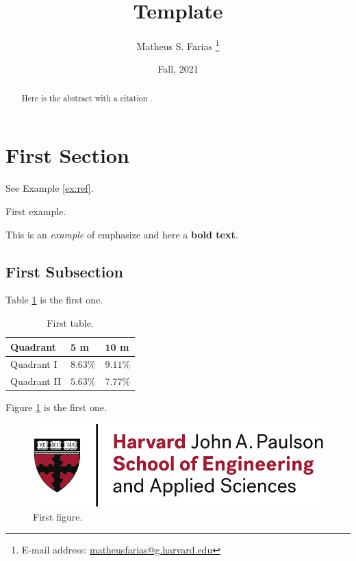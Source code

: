 \documentclass[abstract=true]{scrartcl}
\begin{document}
\title{Template}
\date{Fall, 2021}

\author{Matheus S. Farias%
  \thanks{E-mail address: \href{mailto:matheusfarias@g.harvard.edu}{matheusfarias@g.harvard.edu}}}

\maketitle

\begin{abstract}
    Here is the abstract with a citation \cite{shannon48}.
\end{abstract}

\tableofcontents

\section{First Section}
See Example \ref{ex:ref}.
\begin{example}
    First example.
    \label{ex:ref}
\end{example}

This is an \emph{example} of emphasize and here a \textbf{bold text}.

\subsection{First Subsection}

Table \ref{tab:ref} is the first one.
\begin{table}[h]
    \centering
    \caption{\label{tab:ref}First table.}
    \vspace{5pt}
    \begin{tabular}{@{}lll@{}}
    \toprule
    \textbf{Quadrant}    & $\mathbf{5}$ \textbf{m}    & $\mathbf{10}$ \textbf{m}    \\
    \midrule
    Quadrant I  & $8.63\%$ & $9.11\%$ \\
    Quadrant II & $5.63\%$ & $7.77\%$   \\ 
    \bottomrule
\end{tabular}
\end{table}

Figure \ref{fig:ref} is the first one.
\begin{figure}
    \centering
    \includegraphics[width = \textwidth]{logo.pdf}
    \caption{First figure.}
    \label{fig:ref}
\end{figure}


\end{document}

